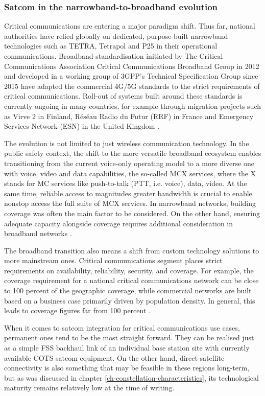 \documentclass[english, 12pt, a4paper, elec, utf8, a-1b, online]{aaltothesis}
\begin{document}
\subsubsection{Satcom in the narrowband-to-broadband evolution}
Critical communications are entering a major paradigm shift. Thus far, national authorities have relied globally on dedicated, purpose-built narrowband technologies such as TETRA, Tetrapol and P25 in their operational communications. Broadband standardisation initiated by The Critical Communications Association Critical Communications Broadband Group in 2012 and developed in a working group of 3GPP's Technical Specification Group since 2015 have adapted the commercial 4G/5G standards to the strict requirements of critical communications. Roll-out of systems built around these standards is currently ongoing in many countries, for example through migration projects such as Virve 2 in Finland, Réséau Radio du Futur (RRF) in France and Emergency Services Network (ESN) in the United Kingdom \cite{stojkovic2016public}.

The evolution is not limited to just wireless communication technology. In the public safety context, the shift to the more versatile broadband ecosystem enables transitioning from the current voice-only operating model to a more diverse one with voice, video and data capabilities, the so-called MCX services, where the X stands for MC services like push-to-talk (PTT, i.e. voice), data, video.
At the same time, reliable access to magnitudes greater bandwidth is crucial to enable nonstop access the full suite of MCX services.
In narrowband networks, building coverage was often the main factor to be considered.
On the other hand, ensuring adequate capacity alongside coverage requires additional consideration in broadband networks \cite{saynevirta2021satellite}.

The broadband transition also means a shift from custom technology solutions to more mainstream ones. Critical communications segment places strict requirements on availability, reliability, security, and coverage. For example, the coverage requirement for a national critical communications network can be close to 100 percent of the geographic coverage, while commercial networks are built based on a business case primarily driven by population density. In general, this leads to coverage figures far from 100 percent \cite{saynevirta2021satellite}.

When it comes to satcom integration for critical communications use cases, permanent ones tend to be the most straight forward. They can be realised just as a simple FSS backhaul link of an individual base station site with currently available COTS satcom equipment.
On the other hand, direct satellite connectivity is also something that may be feasible in these regions long-term, but as was discussed in chapter \ref{ch-constellation-characteristics}, its technological maturity remains relatively low at the time of writing.
\end{document}
